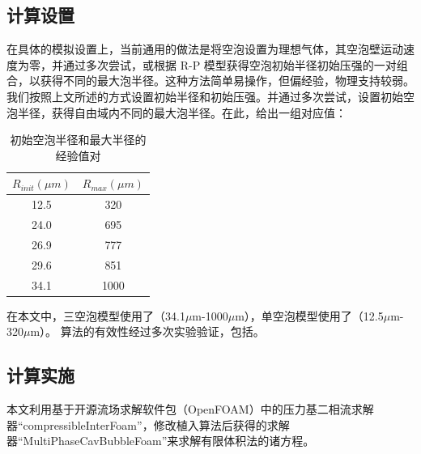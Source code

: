 %
\medskip
\bigskip
\subsection{计算设置}

在具体的模拟设置上，当前通用的做法是将空泡设置为理想气体，其空泡壁运动速度为零，并通过多次尝试，或根据
R-P
模型获得空泡初始半径初始压强的一对组合，以获得不同的最大泡半径。这种方法简单易操作，但偏经验，物理支持较弱。我们按照上文所述的方式设置初始半径和初始压强。并通过多次尝试，设置初始空泡半径，获得自由域内不同的最大泡半径。在此，给出一组对应值：

\begin{table}[htp]
    \centering
    \begin{tabular}{|c|c|}
    \hline
        $R_{init}(\mu m )$& $R_{max}(\mu m )$\\
    \hline
         12.5 & 320 \\
    \hline
        24.0 & 695 \\
    \hline
        26.9 & 777 \\
    \hline
        29.6 & 851 \\
    \hline
        34.1 & 1000 \\
    \hline
    \end{tabular}
    \caption{初始空泡半径和最大半径的经验值对}
    \label{tab2.2}
\end{table}


在本文中，三空泡模型使用了（34.1$\mu$m-1000$\mu$m），单空泡模型使用了（12.5$\mu$m-320$\mu$m）。
算法的有效性经过多次实验验证，包括\cite{koch_numerical_2016,lechner_pressure_2017}。
\medskip
\bigskip
\subsection{计算实施}

本文利用基于开源流场求解软件包（OpenFOAM）中的压力基二相流求解器``compressibleInterFoam''，修改植入算法后获得的求解器``MultiPhaseCavBubbleFoam''来求解有限体积法的诸方程。


